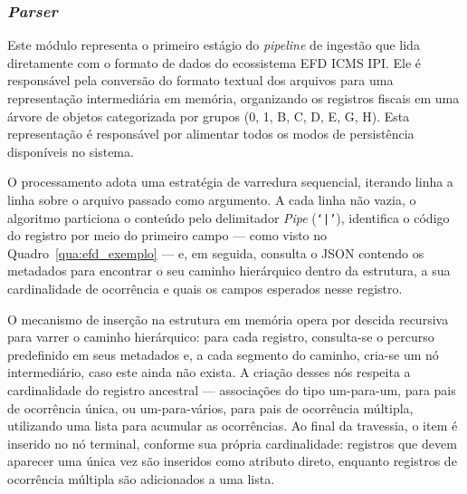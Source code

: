 \subsubsection{\textit{Parser}}
Este módulo representa o primeiro estágio do \textit{pipeline} de ingestão
que lida diretamente com o formato de dados do ecossistema EFD ICMS IPI.
Ele é responsável pela conversão do formato textual dos arquivos para uma
representação intermediária em memória, organizando os registros fiscais em uma
árvore de objetos categorizada por grupos (0, 1, B, C, D, E, G, H). Esta
representação é responsável por alimentar todos os modos de persistência
disponíveis no sistema.

O processamento adota uma estratégia de varredura sequencial, iterando linha a
linha sobre o arquivo passado como argumento. A cada linha não vazia, o
algoritmo particiona o conteúdo pelo delimitador \textit{Pipe} (\texttt{`|'}),
identifica o código do registro por meio do primeiro campo --- como visto no
Quadro~\ref{qua:efd_exemplo} --- e, em seguida, consulta o JSON contendo
os metadados para encontrar o seu caminho hierárquico dentro da estrutura, a sua
cardinalidade de ocorrência e quais os campos esperados nesse registro.

O mecanismo de inserção na estrutura em memória opera por descida recursiva
para varrer o caminho hierárquico: para cada registro, consulta-se o percurso
predefinido em seus metadados e, a cada segmento do caminho, cria-se um nó
intermediário, caso este ainda não exista. A criação desses nós respeita a
cardinalidade do registro ancestral --- associações do tipo um-para-um, para
pais de ocorrência única, ou um-para-vários, para pais de ocorrência múltipla,
utilizando uma lista para acumular as ocorrências. Ao final da travessia, o
item é inserido no nó terminal, conforme sua própria cardinalidade: registros
que devem aparecer uma única vez são inseridos como atributo direto, enquanto
registros de ocorrência múltipla são adicionados a uma lista.

